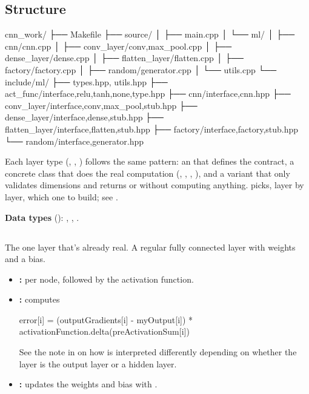 \subsection{Structure}

\begin{console}
cnn_work/
├── Makefile
├── source/
│   ├── main.cpp
│   └── ml/
│       ├── cnn/cnn.cpp
│       ├── conv_layer/{conv,max_pool}.cpp
│       ├── dense_layer/dense.cpp
│       ├── flatten_layer/flatten.cpp
│       ├── factory/factory.cpp
│       ├── random/generator.cpp
│       └── utils.cpp
└── include/ml/
    ├── types.hpp, utils.hpp
    ├── act_func/{interface,relu,tanh,none,type}.hpp
    ├── cnn/{interface,cnn}.hpp
    ├── conv_layer/{interface,conv,max_pool,stub}.hpp
    ├── dense_layer/{interface,dense,stub}.hpp
    ├── flatten_layer/{interface,flatten,stub}.hpp
    ├── factory/{interface,factory,stub}.hpp
    └── random/{interface,generator}.hpp
\end{console}

\noindent Each layer type (, , ) follows the
same pattern: an  that defines the contract, a concrete class that does the real
computation (, , , ), and a  variant
that only validates dimensions and returns  or  without computing anything.
 picks, layer by layer, which one to build; see .

\textbf{Data types} (): ,
, .

\subsection{}
The one layer that's already real. A regular fully connected layer with weights and a bias.
\begin{itemize}
  \item \textbf{:}  per node,
    followed by the activation function.
  \item \textbf{:} computes
\begin{cppcode}
error[i] = (outputGradients[i] - myOutput[i])
         * activationFunction.delta(preActivationSum[i])
\end{cppcode}
    See the note in  on how  is interpreted differently
    depending on whether the layer is the output layer or a hidden layer.
  \item \textbf{:} updates the weights and bias with
    .
\end{itemize}

